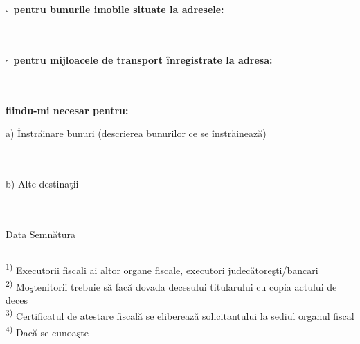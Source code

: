 \documentclass[11pt,a4paper]{article}
\newcommand{\fillline}[1][6cm]{\underline{\hspace{#1}}}
\newcommand{\checkboxempty}{$\square$}
\begin{document}
\vspace{0.3cm}

\checkboxempty\ \textbf{pentru bunurile imobile situate la adresele:} \hrulefill\\
\hrulefill\\
\hrulefill\\
\hrulefill

\vspace{0.3cm}

\checkboxempty\ \textbf{pentru mijloacele de transport înregistrate la adresa:} \hrulefill\\
\hrulefill\\
\hrulefill\\
\hrulefill

\vspace{0.3cm}

\textbf{fiindu-mi necesar pentru:}

\vspace{0.2cm}

a) Înstrăinare bunuri (descrierea bunurilor ce se înstrăinează) \hrulefill\\
\hrulefill\\
\hrulefill\\
\hrulefill

\vspace{0.2cm}

b) Alte destinaţii \hrulefill\\
\hrulefill\\
\hrulefill\\
\hrulefill

\vspace{0.8cm}

Data \fillline[4cm] \hfill Semnătura \fillline[5cm]

\vspace{0.5cm}
\hrule
\vspace{0.2cm}

\footnotesize
\textsuperscript{1)} Executorii fiscali ai altor organe fiscale, executori judecătoreşti/bancari\\
\textsuperscript{2)} Moştenitorii trebuie să facă dovada decesului titularului cu copia actului de deces\\
\textsuperscript{3)} Certificatul de atestare fiscală se eliberează solicitantului la sediul organul fiscal\\
\textsuperscript{4)} Dacă se cunoaşte

\vspace{0.5cm}
\end{document}

